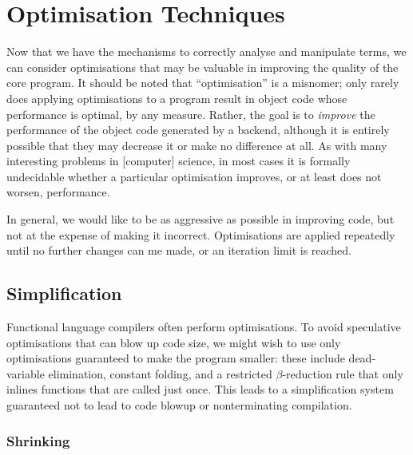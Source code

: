 

\section{Optimisation Techniques}

Now that we have the mechanisms to correctly analyse and manipulate terms, we
can consider optimisations that may be valuable in improving the quality of the
core program. It should be noted that ``optimisation'' is a misnomer; only
rarely does applying optimisations to a program result in object code whose
performance is optimal, by any measure. Rather, the goal is to \emph{improve}
the performance of the object code generated by a backend, although it is
entirely possible that they may decrease it or make no difference at all. As
with many interesting problems in [computer] science, in most cases it is
formally undecidable whether a particular optimisation improves, or at least
does not worsen, performance.

In general, we would like to be as aggressive as possible in improving code, but
not at the expense of making it incorrect. Optimisations are applied repeatedly
until no further changes can me made, or an iteration limit is reached.


\subsection{Simplification}
\label{sec:simplification}

Functional language compilers often perform optimisations. To avoid speculative
optimisations that can blow up code size, we might wish to use only
optimisations guaranteed to make the program smaller: these include
dead-variable elimination, constant folding, and a restricted $\beta$-reduction
rule that only inlines functions that are called just once. This leads to a
simplification system guaranteed not to lead to code blowup or nonterminating
compilation.

\subsubsection{Shrinking}

